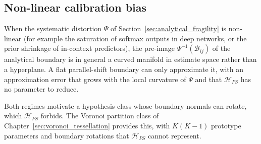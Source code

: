 \subsection{Non-linear calibration bias}
When the systematic distortion $\Psi$ of Section~\ref{sec:analytical_fragility} is non-linear (for example the saturation of softmax outputs in deep networks, or the prior shrinkage of in-context predictors), the pre-image $\Psi^{-1}(\mathcal{B}_{ij})$ of the analytical boundary is in general a curved manifold in estimate space rather than a hyperplane. A flat parallel-shift boundary can only approximate it, with an approximation error that grows with the local curvature of $\Psi$ and that $\mathcal{H}_{PS}$ has no parameter to reduce.

Both regimes motivate a hypothesis class whose boundary normals can rotate, which $\mathcal{H}_{PS}$ forbids. The Voronoi partition class of Chapter~\ref{sec:voronoi_tessellation} provides this, with $K(K-1)$ prototype parameters and boundary rotations that $\mathcal{H}_{PS}$ cannot represent.
